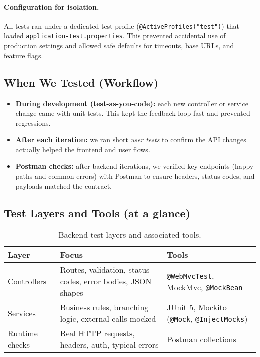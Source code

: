 \paragraph{Configuration for isolation.}
All tests ran under a dedicated test profile (\texttt{@ActiveProfiles("test")}) that loaded \texttt{application-test.properties}. This prevented accidental use of production settings and allowed safe defaults for timeouts, base URLs, and feature flags.

\subsection{When We Tested (Workflow)}
\begin{itemize}
    \item \textbf{During development (test-as-you-code):} each new controller or service change came with unit tests. This kept the feedback loop fast and prevented regressions.
    \item \textbf{After each iteration:} we ran short \emph{user tests} to confirm the API changes actually helped the frontend and user flows.
    \item \textbf{Postman checks:} after backend iterations, we verified key endpoints (happy paths and common errors) with Postman to ensure headers, status codes, and payloads matched the contract.
\end{itemize}

\subsection{Test Layers and Tools (at a glance)}
\begin{table}[H]
\centering
\small
\begin{tabular}{p{3.2cm} p{6.8cm} p{3.2cm}}
\toprule
\textbf{Layer} & \textbf{Focus} & \textbf{Tools} \\
\midrule
Controllers & Routes, validation, status codes, error bodies, JSON shapes & \texttt{@WebMvcTest}, MockMvc, \texttt{@MockBean} \\
Services & Business rules, branching logic, external calls mocked & JUnit 5, Mockito (\texttt{@Mock}, \texttt{@InjectMocks}) \\
Runtime checks & Real HTTP requests, headers, auth, typical errors & Postman collections \\
\bottomrule
\end{tabular}
\caption{Backend test layers and associated tools.}
\label{tab:be-layers-tools}
\end{table}

